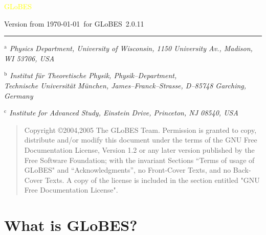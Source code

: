 \documentclass[a4paper,12pt,twoside]{book}
\newcommand{\GLOBES}{{\sf GLoBES}}
\begin{document}
{\begin{center}
\vspace*{-1cm}

{\Huge \textcolor{yellow}{GLoBES}}
\end{center}

\vspace{1cm}

\begin{center}
Version from \today\ for \GLOBES\ 2.0.11
\end{center}


\vspace*{0.5cm}
\vfill
\hrule


{\em\small $^{\mathrm{a}}$%
       Physics Department,
       University of Wisconsin,
       1150 University Av., Madison, WI 53706, USA}


{\em\small $^{\mathrm{b}}$%
       Institut f\"ur Theoretische Physik, Physik--Department,\\
       Technische Universit\"at M\"unchen,
       James--Franck--Strasse, D--85748 Garching, Germany}

{\em\small $^{\mathrm{c}}$%
       Institute for Advanced Study, 
       Einstein Drive, Princeton, NJ 08540, USA}



}


\clearpage
\thispagestyle{empty}
\bigskip
\begin{quote}
    Copyright \copyright  2004,2005  The GLoBES Team.
    Permission is granted to copy, distribute and/or modify this document
    under the terms of the GNU Free Documentation License, Version 1.2
    or any later version published by the Free Software Foundation;
    with the invariant Sections ``Terms of usage of \GLOBES" 
    and ``Acknowledgments'', no Front-Cover Texts, and no Back-Cover Texts.
    A copy of the license is included in the section entitled "GNU
    Free Documentation License".
\end{quote}
\bigskip
    


\cleardoublepage
\setcounter{page}{1}

\chapter*{What is \GLOBES ?}
\end{document}

